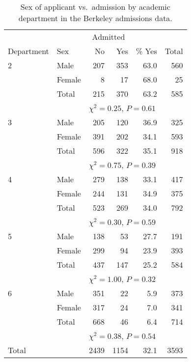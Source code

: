 \begin{table}[t]
\caption{
Sex of applicant vs.\ admission by academic department
in the Berkeley admissions data.
}
\label{t_berkeley2}
\begin{center}
\begin{tabular}{|ll|rr|r|r|}\hline
& & \multicolumn{2}{|c|}{Admitted} & &  \\
Department & Sex & No & Yes & \% Yes& Total  \\ \hline
2& Male & 207 &  353 & 63.0 & 560 \\
& Female & 8 & 17 & 68.0 & 25 \\ \hline
& Total & 215 & 370 & 63.2 & 585 \\ \hline
\multicolumn{2}{|l}{$\,$ }&  \multicolumn{4}{l|}{$\chi^{2}=0.25$,
$P=0.61$}\\
\hline
3& Male & 205 &  120 & 36.9 & 325 \\
& Female & 391 & 202 & 34.1 & 593 \\ \hline
& Total & 596 & 322 & 35.1 & 918 \\ \hline
\multicolumn{2}{|l}{$\,$ }&
\multicolumn{4}{l|}{$\chi^{2}=0.75$, $P=0.39$}\\
\hline
4& Male & 279 &  138 & 33.1 & 417 \\
& Female & 244 & 131 & 34.9 & 375 \\ \hline
& Total & 523 & 269 & 34.0 & 792 \\ \hline
\multicolumn{2}{|l}{$\,$ }&
\multicolumn{4}{l|}{$\chi^{2}=0.30$, $P=0.59$}\\
\hline
5& Male & 138 &  53 & 27.7 & 191 \\
& Female & 299 & 94 & 23.9 & 393 \\ \hline
& Total & 437 & 147 & 25.2 & 584 \\ \hline
\multicolumn{2}{|l}{$\,$ }&
\multicolumn{4}{l|}{$\chi^{2}=1.00$, $P=0.32$}\\
\hline
6& Male & 351 & 22 & 5.9 & 373 \\
& Female & 317 & 24 & 7.0 & 341 \\ \hline
& Total & 668 & 46 & 6.4 & 714 \\ \hline
\multicolumn{2}{|l}{$\,$ }&
\multicolumn{4}{l|}{$\chi^{2}=0.38$, $P=0.54$}\\
\hline
Total & & 2439 & 1154 & 32.1 & 3593 \\ \hline
\end{tabular}
\end{center}
\end{table}

